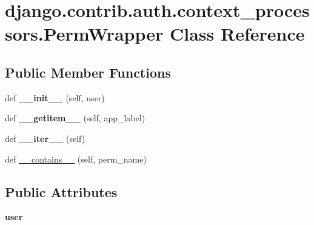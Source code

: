 \hypertarget{classdjango_1_1contrib_1_1auth_1_1context__processors_1_1_perm_wrapper}{}\section{django.\+contrib.\+auth.\+context\+\_\+processors.\+Perm\+Wrapper Class Reference}
\label{classdjango_1_1contrib_1_1auth_1_1context__processors_1_1_perm_wrapper}
\subsection*{Public Member Functions}
\begin{DoxyCompactItemize}
\item 
\mbox{\label{classdjango_1_1contrib_1_1auth_1_1context__processors_1_1_perm_wrapper_a91402db7a98641a29c7bfc37a8e2c1bc}} 
def {\bfseries \+\_\+\+\_\+init\+\_\+\+\_\+} (self, user)
\item 
\mbox{\label{classdjango_1_1contrib_1_1auth_1_1context__processors_1_1_perm_wrapper_aa1d1f145589bfd60004a589063207f6b}} 
def {\bfseries \+\_\+\+\_\+getitem\+\_\+\+\_\+} (self, app\+\_\+label)
\item 
\mbox{\label{classdjango_1_1contrib_1_1auth_1_1context__processors_1_1_perm_wrapper_a6a632164a7f1c20f4af0c5988e7be67a}} 
def {\bfseries \+\_\+\+\_\+iter\+\_\+\+\_\+} (self)
\item 
def \mbox{\hyperlink{classdjango_1_1contrib_1_1auth_1_1context__processors_1_1_perm_wrapper_aa302f9086e35c2330906c83ede2501ef}{\+\_\+\+\_\+contains\+\_\+\+\_\+}} (self, perm\+\_\+name)
\end{DoxyCompactItemize}
\subsection*{Public Attributes}
\begin{DoxyCompactItemize}
\item 
\mbox{\label{classdjango_1_1contrib_1_1auth_1_1context__processors_1_1_perm_wrapper_a426640a7825673dac1c16c35f8c34595}} 
{\bfseries user}
\end{DoxyCompactItemize}


